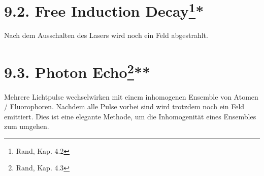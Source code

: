 \section{9.2. Free Induction Decay\protect\footnote{Rand, Kap. 4.2}\hfill **} 

Nach dem Ausschalten des Lasers wird noch ein Feld
abgestrahlt.

\section{9.3. Photon Echo\protect\footnote{Rand, Kap. 4.3}\hfill ***} 

Mehrere Lichtpulse wechselwirken mit einem inhomogenen
Ensemble von Atomen / Fluorophoren. Nachdem alle Pulse
vorbei sind wird trotzdem noch ein Feld emittiert. Dies ist
eine elegante Methode, um die Inhomogenität eines Ensembles
zum umgehen.
 
 